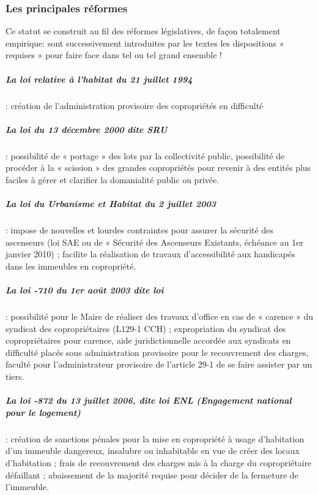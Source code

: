 			\subsubsection{Les principales réformes}
			
				Ce statut se construit au fil des réformes législatives, de façon totalement empirique: sont successivement introduites par les textes les dispositions « requises » pour faire face dans tel ou tel grand ensemble !

				\subparagraph{La loi relative à l'habitat du 21 juillet 1994} : création de l’administration provisoire des copropriétés en difficulté
				
				\subparagraph{La loi du 13 décembre 2000 dite SRU} : possibilité de « portage » des lots par la collectivité public, possibilité de procéder à la « scission » des grandes copropriétés pour revenir à des entités plus faciles à gérer et clarifier la domanialité public ou privée.
				
				\subparagraph{La loi du Urbanisme et Habitat du 2 juillet 2003 }: impose de nouvelles et lourdes contraintes pour assurer la sécurité des ascenseurs (loi SAE ou de « Sécurité des Ascenseurs Existants, échéance au 1er janvier 2010) ; facilite la réalisation de travaux d’accessibilité aux handicapés dans les immeubles en copropriété.
				
				\subparagraph{La loi -710 du 1er août 2003 dite loi } : possibilité pour le Maire de réaliser des travaux d’office en cas de « carence » du syndicat des copropriétaires (L129-1 CCH) ; expropriation du syndicat des copropriétaires pour carence, aide juridictionnelle accordée aux syndicats en difficulté placés sous administration provisoire pour le recouvrement des charges, faculté pour l’administrateur provisoire de l’article 29-1 de se faire assister par un tiers.
				
				\subparagraph{La loi -872 du 13 juillet 2006, dite loi ENL (Engagement national pour le logement)} : création de sanctions pénales pour la mise en copropriété à usage d’habitation d’un immeuble dangereux, insalubre ou inhabitable en vue de créer des locaux d’habitation ; frais de recouvrement des charges mis à la charge du copropriétaire défaillant ; abaissement de la majorité requise pour décider de la fermeture de l’immeuble.
				
